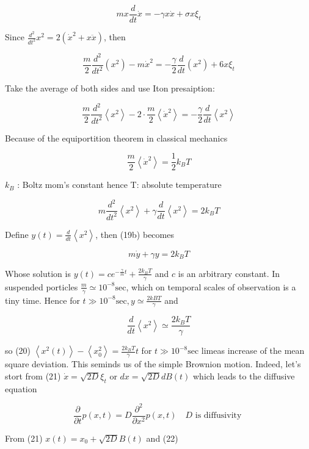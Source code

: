 $$ m x \frac{d}{d t} \dot{x}=-\gamma x \dot{x}+\sigma x \xi_{t} $$

Since $\frac{d^{2}}{d t^{2}} x^{2}=2\left(\dot{x}^{2}+x \ddot{x}\right)$, then

$$ \frac{m}{2} \frac{d^{2}}{d t^{2}}\left(x^{2}\right)-m \dot{x}^{2}=-\frac{\gamma}{2} \frac{d}{d t}\left(x^{2}\right)+6 x \xi_{t} $$

Take the average of both sides and use Iton presaiption:

$$ \frac{m}{2} \frac{d^{2}}{d t^{2}}\left\langle x^{2}\right\rangle-2 \cdot \frac{m}{2}\left\langle\dot{x}^{2}\right\rangle=-\frac{\gamma}{2} \frac{d}{d t}\left\langle x^{2}\right\rangle $$

Because of the equiportition theorem in classical mechanics

$$ \frac{m}{2}\left\langle\dot{x}^{2}\right\rangle=\frac{1}{2} k_{B} T $$

$k_{B}$ : Boltz mom's constant
hence T: absolute temperature


\begin{equation*}
m \frac{d^{2}}{d t^{2}}\left\langle x^{2}\right\rangle+\gamma \frac{d}{d t}\left\langle x^{2}\right\rangle=2 k_{B} T \tag{19b}
\end{equation*}

Define $y(t)=\frac{d}{d t}\left\langle x^{2}\right\rangle$, then (19b) becomes

$$ m \dot{y}+\gamma y=2 k_{B} T $$

Whose solution is $y(t)=c e^{-\frac{\gamma}{m} t}+\frac{2 k_{B} T}{\gamma}$ and $c$ is an arbitrary constant.
In suspended porticles $\frac{m}{\gamma} \simeq 10^{-8} \mathrm{sec}$, which on temporal scales of observation is a tiny time. Hence for $t \gg 10^{-8} \mathrm{sec}, y \simeq \frac{2 k B T}{\gamma}$ and

$$ \frac{d}{d t}\left\langle x^{2}\right\rangle \simeq \frac{2 k_{B} T}{\gamma} $$

so (20) $\left\langle x^{2}(t)\right\rangle-\left\langle x_{0}^{2}\right\rangle=\frac{2 k_{B} T}{\gamma} t$ for $t \gg 10^{-8} \mathrm{sec}$
limeas increase of the mean square deviation.
This seminds us of the simple Brownion motion. Indeed, let's stort from
(21) $\dot{x}=\sqrt{2 D} \xi_{t}$ or $d x=\sqrt{2 D} d B(t)$
which leads to the diffusive equation

$$ \frac{\partial}{\partial t} p(x, t)=D \frac{\partial^{2}}{\partial x^{2}} p(x, t) \quad D \text { is diffusivity } $$

From (21) $x(t)=x_{0}+\sqrt{2 D} B(t)$ and
(22)

